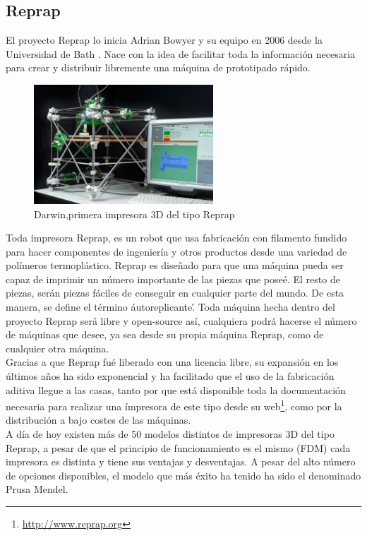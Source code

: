 \subsection{Reprap}
El proyecto Reprap lo inicia Adrian Bowyer y su equipo en 2006 desde la Universidad de Bath \cite{jones2011reprap}. Nace con la idea de facilitar toda la información necesaria para crear y distribuir libremente una máquina de prototipado rápido. 

\begin{figure}[H]
        \centering
        \includegraphics[width=0.6\textwidth]{images/darwin.jpg}
        \caption{Darwin,primera impresora 3D del tipo Reprap}
        \label{fig:estado_darwin}
\end{figure}

Toda impresora Reprap, es un robot que usa fabricación con filamento fundido para hacer componentes de ingeniería y otros productos desde una variedad de polímeros termoplástico. Reprap es diseñado para  que una máquina pueda ser capaz de imprimir un número importante de las piezas que poseé. El resto de piezas, serán piezas fáciles de conseguir en cualquier parte del mundo. De esta manera, se define el término \'autoreplicante\'. Toda máquina hecha dentro del proyecto Reprap será libre y open-source así, cualquiera podrá hacerse el número de máquinas que desee, ya sea desde su propia máquina Reprap, como de cualquier otra máquina.\\

Gracias a que Reprap fué liberado con una licencia libre, su expansión en los últimos años ha sido exponencial y ha facilitado que el uso de la fabricación aditiva llegue a las casas, tanto por que está disponible toda la documentación necesaria para realizar una ímpresora de este tipo desde su web\footnote{\url{http://www.reprap.org}}, como por la distribución a bajo costes de las máquinas.\\

A día de hoy existen más de 50 modelos distintos de impresoras 3D del tipo Reprap, a pesar de que el principio de funcionamiento es el mismo (FDM) cada impresora es distinta y tiene sus ventajas y desventajas. A pesar del alto número de opciones disponibles, el modelo que más éxito ha tenido ha sido el denominado Prusa Mendel.\\

